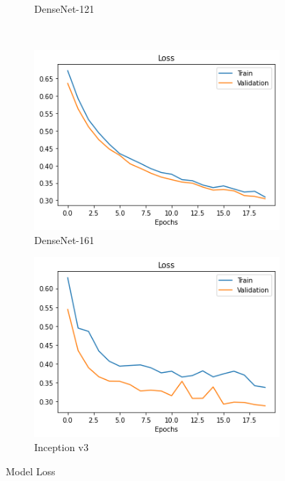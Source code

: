 \documentclass{article}
\begin{document}
\begin{figure}[H]
\begin{subfigure}[b]{0.30\textwidth}
            \caption{DenseNet-121}
            \label{DenseNet-121}
    \end{subfigure} \\
    \begin{subfigure}[b]{0.30\textwidth}
            \centering
            \includegraphics[width=.85\linewidth]{images/densenet161_loss}
            \caption{DenseNet-161}
            \label{DenseNet-161}
    \end{subfigure}%
    \begin{subfigure}[b]{0.30\textwidth}
            \centering
            \includegraphics[width=.85\linewidth]{images/inceptionv3_loss.png}
            \caption{Inception v3}
            \label{Inception v3}
    \end{subfigure}
    \caption{Model Loss}\label{fig:animals}
\end{figure}
\end{document}
